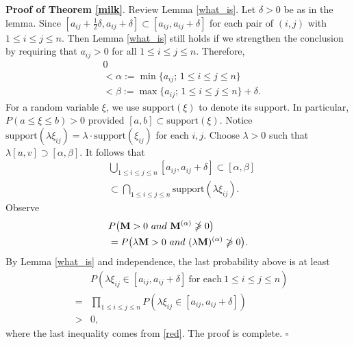 \documentclass[conference,letterpaper]{IEEEtran}
\numberwithin{equation}{section}
\newcommand{\lbl}{\label}
\newcommand{\bd}{\bold}
\newcommand{\beaa}{\begin{eqnarray*}}
\newcommand{\eeaa}{\end{eqnarray*}}
\newcommand{\bea}{\begin{eqnarray}}
\newcommand{\eea}{\end{eqnarray}}
\begin{document}
\noindent\textbf{Proof of Theorem \ref{milk}}. Review Lemma \ref{what_is}. Let $\delta >0$ be as in the lemma. Since $[a_{ij}+\frac{1}{2}\delta, a_{ij}+\delta] \subset [a_{ij}, a_{ij}+\delta]$  for each pair of $(i, j)$ with $1\leq i\leq j \leq n.$ Then Lemma \ref{what_is} still holds if we strengthen the conclusion by requiring  that $a_{ij}>0$ for all $1\leq i\leq j \leq n.$ Therefore,
\bea\lbl{poker}
&0\\
&<\alpha:=\min\{a_{ij};\, 1\leq i\leq j \leq n\}\\
& < \beta:=\max\{a_{ij};\, 1\leq i\leq j \leq n\}+\delta.
\eea
For a random variable $\xi$, we use $\mbox{support}(\xi)$ to denote its support. In particular, $P(a\leq \xi\leq  b)>0$ provided $[a, b]\subset \mbox{support}(\xi)$.
Notice $\mbox{support}(\lambda\xi_{ij})=\lambda\cdot \mbox{support}(\xi_{ij})$ for each $i, j$. Choose $\lambda>0$ such that $\lambda [u, v]\supset [\alpha , \beta]$. It follows that
\bea\lbl{red}
& \bigcup_{1\leq i\leq  j\leq n}[a_{ij}, a_{ij}+\delta] \subset [\alpha, \beta]\\
& \subset \bigcap_{1\leq i\leq  j\leq n}  \mbox{support}(\lambda\xi_{ij}).
\eea
Observe
\beaa
& P\big(\bd{M}>0\ \mbox{and}\ \bd{M}^{(\alpha)}\ngeqslant 0\big)\\
& = P\big(\lambda\bd{M}>0\ \mbox{and}\ (\lambda\bd{M})^{(\alpha)}\ngeqslant 0\big).
\eeaa
By Lemma \ref{what_is} and independence, the last probability above is at least
\beaa
&& P(\lambda \xi_{ij}\in [a_{ij}, a_{ij}+\delta]\ \mbox{for each}\ 1\leq i\leq j \leq n)\\
&=& \prod_{1\leq i\leq j \leq n}P(\lambda\xi_{ij}\in [a_{ij}, a_{ij}+\delta])\\
&>& 0,
\eeaa
where the last inequality comes from \eqref{red}. The proof is complete. \hfill$\square$

\medskip
\end{document}
